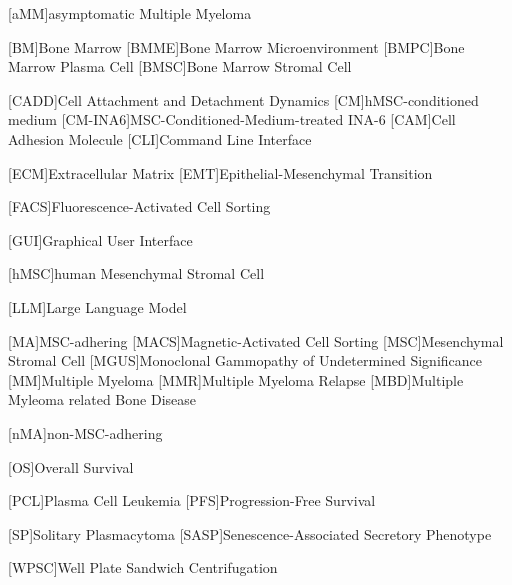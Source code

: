 
%
\label{sec:Abbreviations}%
{%
    \small%
    \begin{spacing}{.0}%
        \begin{acronym}%
            [aMM]{asymptomatic Multiple Myeloma}

            [BM]{Bone Marrow}
            [BMME]{Bone Marrow Microenvironment}
            [BMPC]{Bone Marrow Plasma Cell}
            [BMSC]{Bone Marrow Stromal Cell}

            [CADD]{Cell Attachment and Detachment Dynamics}
            [CM]{hMSC-conditioned medium}
            [CM-INA6]{MSC-Conditioned-Medium-treated INA-6}
            [CAM]{Cell Adhesion Molecule}
            [CLI]{Command Line Interface}

            [ECM]{Extracellular Matrix}
            [EMT]{Epithelial-Mesenchymal Transition}
            
            [FACS]{Fluorescence-Activated Cell Sorting}
            
            [GUI]{Graphical User Interface}
            
            [hMSC]{human Mesenchymal Stromal Cell}

            [LLM]{Large Language Model}
            
            [MA]{MSC-adhering}
            [MACS]{Magnetic-Activated Cell Sorting}
            [MSC]{Mesenchymal Stromal Cell}
            [MGUS]{Monoclonal Gammopathy of Undetermined Significance}
            [MM]{Multiple Myeloma}
            [MMR]{Multiple Myeloma Relapse}
            [MBD]{Multiple Myleoma related Bone Disease}

            [nMA]{non-MSC-adhering}
            
            [OS]{Overall Survival}

            [PCL]{Plasma Cell Leukemia}
            [PFS]{Progression-Free Survival}

            [SP]{Solitary Plasmacytoma}
            [SASP]{Senescence-Associated Secretory Phenotype} %
            
            [WPSC]{Well Plate Sandwich Centrifugation}


        \end{acronym}
    \end{spacing}
}